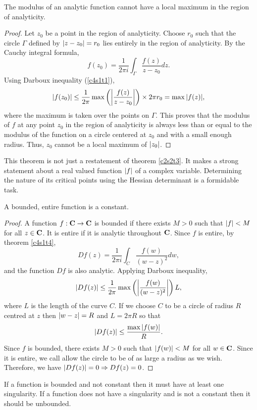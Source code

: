 \begin{thm}\label{c4s2t1}
The modulus of an analytic function cannot have a local maximum in the region
of analyticity.
\end{thm}
\begin{proof}
Let $z_0$ be a point in the region of analyticity. Choose $r_0$ such that the
circle $\Gamma$ defined by $\left\vert{z - z_0}\right\vert = r_0$ lies entirely in the region
of analyticity. By the Cauchy integral formula,
\[
f(z_0) = \frac{1}{2\pi i}\int_\Gamma \frac{f(z)}{z - z_0}dz.
\]
Using Darboux inequality (\ref{c4s1t1}),
\[
\left\vert{f(z_0)}\right\vert \le \frac{1}{2\pi}\max\left(\left\vert{\frac{f(z)}{z - z_0}}\right\vert\right)
\times 2\pi r_0 = \max{\left\vert{f(z)}\right\vert},
\]
where the maximum is taken over the points on $\Gamma$. This proves that the
modulus of $f$ at any point $z_0$ in the region of analyticity is always less
than or equal to the modulus of the function on a circle centered at $z_0$
and with a small enough radius. Thus, $z_0$ cannot be a local maximum of
$\left\vert{z_0}\right\vert$.
\end{proof}

\begin{rem}
This theorem is not just a restatement of theorem \ref{c2s2t3}. It makes a 
strong statement about a real valued function $\left\vert{f}\right\vert$ of a complex variable.
Determining the nature of its critical points using the Hessian determinant is
a formidable task.
\end{rem}

\begin{thm}\label{c4s2t2}
A bounded, entire function is a constant.
\end{thm}
\begin{proof}
A function $f:\mathbf{C}\rightarrow\mathbf{C}$ is bounded if there exists $M > 0$ such that 
$\left\vert{f}\right\vert < M$ for all $z \in \mathbf{C}$. It is entire if it is analytic throughout
$\mathbf{C}$. Since $f$ is entire, by theorem \ref{c4s1t4},
\[
Df(z) = \frac{1}{2\pi i}\int_C \frac{f(w)}{(w - z)^2}dw,
\]
and the function $Df$ is also analytic. Applying Darboux inequality,
\[
\left\vert{Df(z)}\right\vert \le \frac{1}{2\pi}\max\left(\left\vert{\frac{f(w)}{(w-z)^2}}\right\vert\right)L,
\]
where $L$ is the length of the curve $C$. If we choose $C$ to be a circle
of radius $R$ centred at $z$ then $\left\vert{w - z}\right\vert = R$ and $L = 2\pi R$ so that
\[
\left\vert{Df(z)}\right\vert \le \frac{\max{\left\vert{f(w)}\right\vert}}{R}.
\]
Since $f$ is bounded, there exists $M > 0$ such that $\left\vert{f(w)}\right\vert < M$ for
all $w \in \mathbf{C}$. Since it is entire, we call allow the circle to be of as 
large a radius as we wish. Therefore, we have $\left\vert{Df(z)}\right\vert = 0 \Rightarrow
Df(z) = 0$.
\end{proof}

\begin{rem}
If a function is bounded and not constant then it must have at least one 
singularity. If a function does not have a singularity and is not a constant
then it should be unbounded.
\end{rem}


